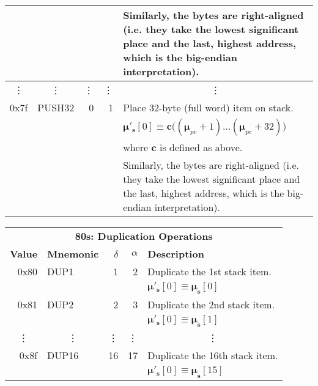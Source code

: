 \documentclass[9pt,oneside]{amsart}
\makeatletter
\newcommand*\ie{i.e.\@\xspace}
\makeatother
\begin{document}
\begin{tabularx}{\textwidth}{rlrrX}
&&&& Similarly, the bytes are right-aligned (\ie they take the lowest significant place and the last, highest address, which is the big-endian interpretation). \\
\midrule
\multicolumn{1}{c}{\vdots} & \multicolumn{1}{c}{\vdots} & \vdots & \vdots & \multicolumn{1}{c}{\vdots} \\
\midrule
0x7f & {\small PUSH32} & 0 & 1 & Place 32-byte (full word) item on stack. \\
&&&& $\boldsymbol{\mu}'_\mathbf{s}[0] \equiv \boldsymbol{c}\big((\boldsymbol{\mu}_{pc} + 1) \dots (\boldsymbol{\mu}_{pc} + 32) \big)$ \\
&&&& where $\boldsymbol{c}$ is defined as above. \\
&&&& Similarly, the bytes are right-aligned (\ie they take the lowest significant place and the last, highest address, which is the big-endian interpretation). \\
\bottomrule
\end{tabularx}

\begin{tabularx}{\textwidth}{rlrrX}
\toprule
\multicolumn{5}{c}{\textbf{80s: Duplication Operations}} \vspace{5pt} \\
\textbf{Value} & \textbf{Mnemonic} & $\delta$ & $\alpha$ & \textbf{Description} \vspace{5pt} \\
0x80 & {\small DUP1} & 1 & 2 & Duplicate the 1st stack item. \\
&&&& $\boldsymbol{\mu}'_\mathbf{s}[0] \equiv \boldsymbol{\mu}_\mathbf{s}[0]$ \\
\midrule
0x81 & {\small DUP2} & 2 & 3 & Duplicate the 2nd stack item. \\
&&&& $\boldsymbol{\mu}'_\mathbf{s}[0] \equiv \boldsymbol{\mu}_\mathbf{s}[1]$ \\
\midrule
\multicolumn{1}{c}{\vdots} & \multicolumn{1}{c}{\vdots} & \vdots & \vdots & \multicolumn{1}{c}{\vdots} \\
\midrule
0x8f & {\small DUP16} & 16 & 17 & Duplicate the 16th stack item. \\
&&&& $\boldsymbol{\mu}'_\mathbf{s}[0] \equiv \boldsymbol{\mu}_\mathbf{s}[15]$ \\
\bottomrule
\end{tabularx}
\end{document}

